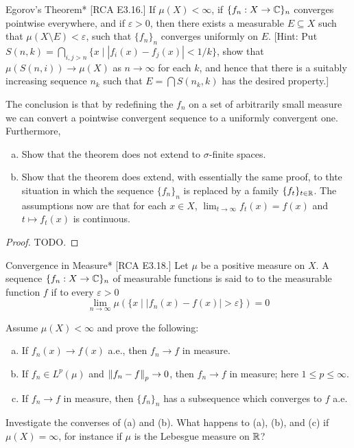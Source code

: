 \begin{problem}{Egorov's Theorem}*
    [RCA E3.16.] If \(\mu(X) < \infty\), if \(\{f_n : X \to \mathbb{C}\}_n\) converges pointwise everywhere, and if \(\varepsilon > 0\), then there exists a measurable \(E \subseteq X\) such that \(\mu(X \setminus E) < \varepsilon\), such that \(\{f_n\}_n\) converges uniformly on \(E\). [Hint: Put \(S(n, k) = \bigcap_{i,j > n} \{x \mid |f_i(x) - f_j(x)| < 1/k\}\), show that \(\mu(S(n, i)) \to \mu(X)\) as \(n \to \infty\) for each \(k\), and hence that there is a suitably increasing sequence \(n_k\) such that \(E = \bigcap S(n_k, k)\) has the desired property.] 
    \stdvspace

    The conclusion is that by redefining the \(f_n\) on a set of arbitrarily small measure we can convert a pointwise convergent sequence to a uniformly convergent one. Furthermore, 
    \begin{enumerate}[(a)]
        \itemsep0em
        \item Show that the theorem does not extend to \(\sigma\)-finite spaces. 
        \item Show that the theorem does extend, with essentially the same proof, to thte situation in which the sequence \(\{f_n\}_n\) is replaced by a family \(\{f_t\}_{t \in \mathbb{R}}\). The assumptions now are that for each \(x \in X\), \(\lim_{t \to \infty} f_t(x) = f(x)\) and \(t \mapsto f_t(x)\) is continuous. 
    \end{enumerate}
\end{problem}

\begin{proof}
    TODO. 
\end{proof}


\begin{problem}{Convergence in Measure}*
    [RCA E3.18.] Let \(\mu\) be a positive measure on \(X\). A sequence \(\{f_n : X \to \mathbb{C}\}_n\) of measurable functions is said to  to the measurable function \(f\) if to every \(\varepsilon > 0\)
    \[
        \lim_{n \to \infty} \mu( \{ x \mid |f_n(x) - f(x)| > \varepsilon \} ) = 0
    \]

    Assume \(\mu(X) < \infty\) and prove the following: 
    \begin{enumerate}[(a)]
        \itemsep0em
        \item If \(f_n(x) \to f(x)\) a.e., then \(f_n \to f\) in measure. 
        \item If \(f_n \in L^p(\mu)\) and \(\norm{f_n - f}_p \to 0\), then \(f_n \to f\) in measure; here \(1 \leq p \leq \infty\). 
        \item If \(f_n \to f\) in measure, then \(\{f_n\}_n\) has a subsequence which converges to \(f\) a.e. 
    \end{enumerate}

    Investigate the converses of (a) and (b). What happens to (a), (b), and (c) if \(\mu(X) = \infty\), for instance if \(\mu\) is the Lebesgue measure on \(\mathbb{R}\)? 
\end{problem}


